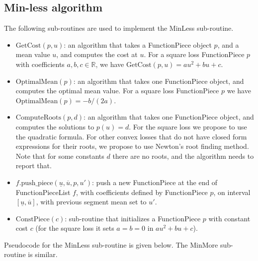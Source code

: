 \documentclass{article}
\newcommand{\RR}{\mathbb R}
\begin{document}
\subsection{Min-less algorithm}

The following sub-routines are used to implement the MinLess
sub-routine.

\begin{itemize}
\item $\text{GetCost}(p, u)$: an algorithm that takes a FunctionPiece
  object $p$, and a mean value $u$, and computes the cost at $u$. For
  a square loss FunctionPiece $p$ with coefficients $a,b,c\in\RR$, we
  have $\text{GetCost}(p,u)=au^2+bu+c$.
\item $\text{OptimalMean}(p)$: an algorithm that takes one
  FunctionPiece object, and computes the optimal mean value. For a
  square loss FunctionPiece $p$ we have
  $\text{OptimalMean}(p)=-b/(2a)$.
\item $\text{ComputeRoots}(p, d)$: an algorithm that takes one
  FunctionPiece object, and computes the solutions to $p(u)=d$. For
  the square loss we propose to use the quadratic formula. For other
  convex losses that do not have closed form expressions for their
  roots, we propose to use Newton's root finding method. Note that for
  some constants $d$ there are no roots, and the algorithm needs to
  report that.
\item $f.\text{push\_piece}(\underline u, \overline u, p, u')$: push a
  new FunctionPiece at the end of FunctionPieceList $f$, with
  coefficients defined by FunctionPiece $p$, on interval
  $[\underline u, \overline u]$, with previous segment mean set to
  $u'$.
\item $\text{ConstPiece}(c)$: sub-routine that initializes a
  FunctionPiece $p$ with constant cost $c$ (for the square loss it
  sets $a=b=0$ in $au^2 + bu + c$).
\end{itemize}

Pseudocode for the MinLess sub-routine is given below. The MinMore
sub-routine is similar.
\end{document}

